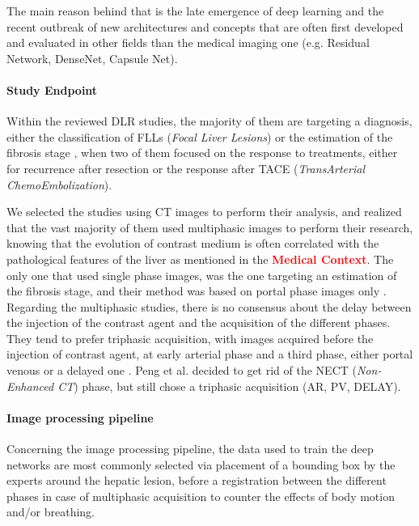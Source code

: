 \documentclass[]{article}
\let\oldparagraph\paragraph
\renewcommand{\paragraph}[1]{\oldparagraph{#1}\mbox{}}
\begin{document}
The main reason behind that is the late emergence of deep learning and
the recent outbreak of new architectures and concepts that are often
first developed and evaluated in other fields than the medical imaging
one (e.g. Residual Network, DenseNet, Capsule Net).

\paragraph{Study Endpoint}\label{study-endpoint}

Within the reviewed DLR studies, the majority of them are
targeting a diagnosis, either the classification of FLLs (\emph{Focal
Liver Lesions}) \cite{Yamada2019,Wang2018,Yasaka2018,Liang2018} or the estimation of the fibrosis
stage \cite{Yasaka2018a}, when two of them focused on the
response to treatments, either for recurrence after resection \cite{WANG2019} or the response after TACE (\emph{TransArterial ChemoEmbolization})\cite{Peng2020}.

We selected the studies using CT images to perform their
analysis, and realized that the vast majority of them used multiphasic
images to perform their research, knowing that the evolution of contrast
medium is often correlated with the pathological features of the liver
as mentioned in the \textcolor{red}{\textbf{Medical Context}}. The only one that used
single phase images, was the one targeting an estimation of the fibrosis
stage, and their method was based on portal phase images only \cite{Yasaka2018a}. Regarding the multiphasic studies,
there is no consensus about the delay between the injection of the
contrast agent and the acquisition of the different phases. They tend to
prefer triphasic acquisition, with images acquired before the injection
of contrast agent, at early arterial phase and a third phase, either
portal venous \cite{WANG2019,Wang2018,Liang2018} or a delayed one \cite{Yamada2019, Yasaka2018}. Peng et al. decided to get rid of the NECT
(\emph{Non-Enhanced CT}) phase, but still chose a triphasic acquisition
(AR, PV, DELAY).

\paragraph{Image processing pipeline}\label{image-processing-pipeline}

Concerning the image processing pipeline, the data used to train the
deep networks are most commonly selected via placement of a bounding box
by the experts around the hepatic lesion, before a registration between
the different phases in case of multiphasic acquisition to counter the
effects of body motion and/or breathing.
\end{document}
